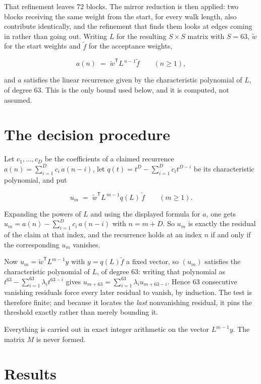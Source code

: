 \documentclass[11pt]{article}
\theoremstyle{definition}
\begin{document}
That refinement leaves $72$ blocks. The mirror reduction is then applied: two blocks receiving the same weight from the start, for every walk length, also contribute identically, and the refinement that finds them looks at edges coming in rather than going out. Writing $L$ for the resulting $S \times S$ matrix with $S = 63$, $\tilde w$ for the start weights and $\tilde f$ for the acceptance weights,

\[a(n) \;=\; \tilde w^{\mathsf T} L^{\,n-1} \tilde f \qquad (n \ge 1),\]

and $a$ satisfies the linear recurrence given by the characteristic polynomial of $L$, of degree $63$. This is the only bound used below, and it is computed, not assumed.

\section{The decision procedure}

Let $c_1,\dots,c_D$ be the coefficients of a claimed recurrence $a(n) = \sum_{i=1}^{D} c_i\,a(n-i)$, let $q(t) = t^{D} - \sum_{i=1}^{D} c_i t^{D-i}$ be its characteristic polynomial, and put

\[u_m \;=\; \tilde w^{\mathsf T} L^{\,m-1} q(L)\,\tilde f \qquad (m \ge 1).\]

Expanding the powers of $L$ and using the displayed formula for $a$, one gets $u_m = a(n) - \sum_{i=1}^{D} c_i\,a(n-i)$ with $n = m + D$. So $u_m$ is exactly the residual of the claim at that index, and the recurrence holds at an index $n$ if and only if the corresponding $u_m$ vanishes.

Now $u_m = \tilde w^{\mathsf T} L^{m-1} y$ with $y = q(L)\tilde f$ a fixed vector, so $(u_m)$ satisfies the characteristic polynomial of $L$, of degree $63$: writing that polynomial as $t^{63} - \sum_{i=1}^{63} \lambda_i t^{63-i}$ gives $u_{m+63} = \sum_{i=1}^{63} \lambda_i u_{m+63-i}$. Hence $63$ consecutive vanishing residuals force every later residual to vanish, by induction. The test is therefore finite; and because it locates the {\itshape last} nonvanishing residual, it pins the threshold exactly rather than merely bounding it.

Everything is carried out in exact integer arithmetic on the vector $L^{m-1}y$. The matrix $M$ is never formed.

\section{Results}
\end{document}
